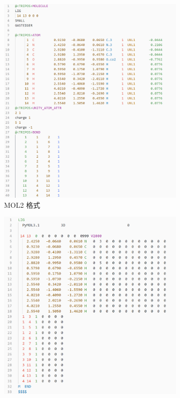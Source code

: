 \begin{figure}[!h]
    \centering
    \begin{subfigure}[c]{0.49\textwidth}
        \centering
        \includegraphics[width=\textwidth]{../images/mol2.png}
        \caption{MOL2 格式}
        \label{fig:mol2-highlighting}
    \end{subfigure}
    \hfill
    \begin{subfigure}[c]{0.49\textwidth}
        \centering
        \includegraphics[width=\textwidth]{../images/sdf.png}

\end{subfigure}
\end{figure}

